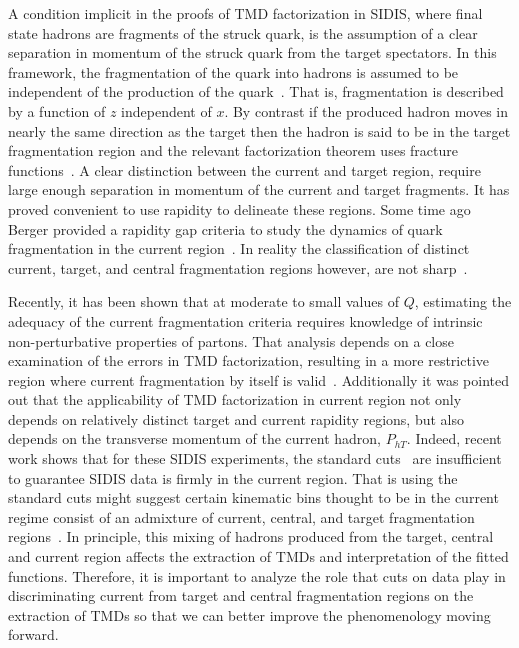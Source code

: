 \documentclass[final,3p,times,onecolumn,sort&compress,hidelinks]{elsarticle}
\newcommand\3[1]{\boldsymbol{#1}}
\newcommand{\cbl}{\color{blue}}
\begin{document}
 A condition implicit in the proofs of TMD factorization in SIDIS,
 where final state hadrons are   fragments of the
 struck quark, is the assumption of  a clear separation in momentum of the struck quark from the target spectators. In this framework,  the fragmentation of the quark into hadrons is assumed to be independent of the production of the quark~\cite{Berger:1987zu,Trentadue:1993ka}. That is, 
 fragmentation is described by a function of $z$ independent of $x$.  By contrast if the produced hadron moves in nearly the same direction as the target then the hadron is said to be in the target fragmentation region and the relevant factorization theorem uses fracture functions~\cite{Trentadue:1993ka,Grazzini:1997ih,Anselmino:2011ss}.   A clear distinction between the current and target  region, require large enough separation in momentum of the current and target fragments.  It has proved  convenient to use rapidity to delineate these regions.   Some time ago Berger provided a rapidity gap criteria  to study the dynamics of quark fragmentation in the current region~\cite{Berger:1987zu,Mulders:2000jt}.  In reality the classification of distinct current, target, and central fragmentation regions however, are not sharp~\cite{Berger:1987zu,Mulders:2000jt,Joosten:2013mia,Boglione:2016bph,Collins:2018teg}.

 Recently, it has been shown that at moderate to small values of $Q$, estimating the adequacy of the current fragmentation criteria requires knowledge of intrinsic non-perturbative properties of partons. That analysis depends on a close examination of the errors in TMD factorization, resulting in
 a more restrictive region where current fragmentation by itself is valid~\cite{Boglione:2016bph}.
 Additionally it was pointed out that the applicability of TMD factorization  %
 in  current region not only depends on 
 relatively distinct target and current rapidity regions, but also depends on the transverse momentum of the current hadron, $P_{hT}$.
 Indeed, recent work shows that for these SIDIS experiments, the standard cuts~\cite{Anselmino:2013lza,Bacchetta:2017gcc}
 are insufficient to guarantee %
  SIDIS data is firmly in the current region.
  That is using the  standard cuts
 might suggest 
 certain kinematic bins thought to be
 in the current regime consist of an admixture of
 current, central, and  target fragmentation regions~\cite{Boglione:2016bph}.  In principle, this mixing of hadrons produced from the target, central and current region {\cbl affects} the extraction of TMDs and interpretation of the fitted functions.  {\cbl Therefore, it is important to analyze the role that   cuts on data play in
 discriminating  current  from target and central fragmentation regions on the
 extraction of TMDs so that we can better improve the phenomenology moving forward.}
\end{document}
